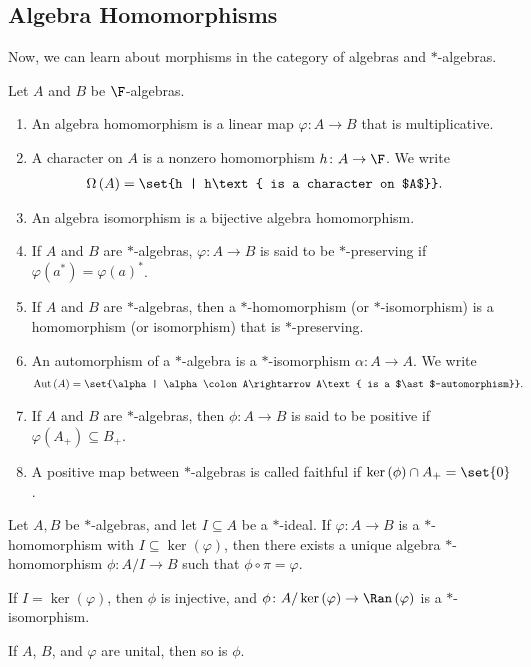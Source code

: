 \documentclass[10pt]{mypackage}
\begin{document}
\subsection{Algebra Homomorphisms}%
Now, we can learn about morphisms in the category of algebras and $\ast$-algebras.
\begin{definition}
  Let $A$ and $B$ be $\F$-algebras.
  \begin{enumerate}[(1)]
    \item An algebra homomorphism is a linear map $\varphi\colon A\rightarrow B$ that is multiplicative.
    \item A character on $A$ is a nonzero homomorphism $h \colon A\rightarrow \F$. We write
      \begin{align*}
        \Omega\left(A\right) &= \set{h | h\text{ is a character on $A$}}.
      \end{align*}
    \item An algebra isomorphism is a bijective algebra homomorphism.
    \item If $A$ and $B$ are $\ast$-algebras, $\varphi\colon A\rightarrow B$ is said to be $\ast$-preserving if $\varphi\left(a^{\ast} \right) = \varphi\left(a\right)^{\ast}$.
    \item If $A$ and $B$ are $\ast$-algebras, then a $\ast$-homomorphism (or $\ast$-isomorphism) is a homomorphism (or isomorphism) that is $\ast$-preserving.
    \item An automorphism of a $\ast$-algebra is a $\ast$-isomorphism $\alpha\colon A\rightarrow A$. We write
      \begin{align*}
        \operatorname{Aut}\left(A\right) &= \set{\alpha | \alpha \colon A\rightarrow A\text{ is a $\ast$-automorphism}}.
      \end{align*}
    \item If $A$ and $B$ are $\ast$-algebras, then $\phi\colon A\rightarrow B$ is said to be positive if $\varphi\left(A_{+}\right) \subseteq B_{+}$.
    \item A positive map between $\ast$-algebras is called faithful if $\ker\left(\phi\right) \cap A_{+} = \set{0}$.
  \end{enumerate}
\end{definition}
\begin{theorem}
  Let $A,B$ be $\ast$-algebras, and let $I\subseteq A$ be a $\ast$-ideal. If $\varphi\colon A\rightarrow B$ is a $\ast$-homomorphism with $I\subseteq \ker\left(\varphi\right)$, then there exists a unique algebra $\ast$-homomorphism $\phi\colon A/I\rightarrow B$ such that $\phi\circ \pi = \varphi$.\newline

  If $I = \ker\left(\varphi\right)$, then $\phi$ is injective, and $\phi\colon A/\ker\left(\varphi\right)\rightarrow \Ran\left(\varphi\right)$ is a $\ast$-isomorphism.\newline

   If $A$, $B$, and $\varphi$ are unital, then so is $\phi$.
\end{theorem}
\end{document}
